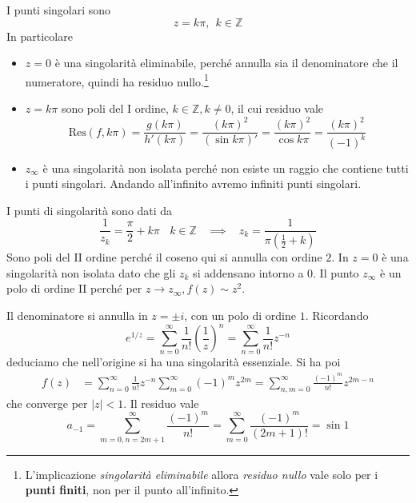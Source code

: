 I punti singolari sono
\begin{equation*}
z=k\pi ,\ \ k\in \mathbb{Z}
\end{equation*}
In particolare
\begin{itemize}
\item $z=0$ è una singolarità eliminabile, perché annulla sia il denominatore che il numeratore, quindi ha residuo nullo.\footnote{L'implicazione \textit{singolarità eliminabile} allora \textit{residuo nullo} vale solo per i \textbf{punti finiti}, non per il punto all'infinito.}
\item $z=k\pi $ sono poli del I ordine, $k\in \mathbb{Z} ,k\neq 0$, il cui residuo vale\begin{equation*}
\mathrm{Res}\left( f,k\pi \right) =\frac{g\left( k\pi \right)}{h'\left( k\pi \right)} =\frac{\left( k\pi \right)^{2}}{\left(\sin k\pi \right) '} =\frac{\left( k\pi \right)^{2}}{\cos k\pi } =\frac{\left( k\pi \right)^{2}}{\left( -1\right)^{k}}
\end{equation*}
\item $z_{\infty }$ è una singolarità non isolata perché non esiste un raggio che contiene tutti i punti singolari. Andando all'infinito avremo infiniti punti singolari.
\end{itemize}
\Soluzione

I punti di singolarità sono dati da
\begin{equation*}
\frac{1}{z_{k}} =\frac{\pi }{2} +k\pi \ \ \ \ k\in \mathbb{Z} \ \ \ \ \implies \ \ \ \ z_{k} =\frac{1}{\pi \left(\frac{1}{2} +k\right)}
\end{equation*}
Sono poli del II ordine perché il coseno qui si annulla con ordine $2$. In $z=0$ è una singolarità non isolata dato che gli $z_{k}$ si addensano intorno a $0$. Il punto $z_{\infty }$ è un polo di ordine II perché per $z\rightarrow z_{\infty } ,f\left( z\right) \sim z^{2}$.
\Soluzione

Il denominatore si annulla in $z=\pm i$, con un polo di ordine $1$. Ricordando
\begin{equation*}
e^{1/z} =\sum\limits ^{\infty }_{n=0}\frac{1}{n!}\left(\frac{1}{z}\right)^{n} =\sum\limits ^{\infty }_{n=0}\frac{1}{n!} z^{-n}
\end{equation*}
deduciamo che nell'origine si ha una singolarità essenziale. Si ha poi
\begin{align*}
f\left( z\right) & =\sum\limits ^{\infty }_{n=0}\frac{1}{n!} z^{-n}\sum\limits ^{\infty }_{m=0}\left( -1\right)^{m} z^{2m} =\sum\limits ^{\infty }_{n,m=0}\frac{\left( -1\right)^{m}}{n!} z^{2m-n}
\end{align*}
che converge per $\left| z\right| < 1$. Il residuo vale
\begin{equation*}
a_{-1} =\sum\limits ^{\infty }_{m=0,n=2m+1}\frac{\left( -1\right)^{m}}{n!} =\sum\limits ^{\infty }_{m=0}\frac{\left( -1\right)^{m}}{\left( 2m+1\right) !} =\sin 1
\end{equation*}
\Soluzione

